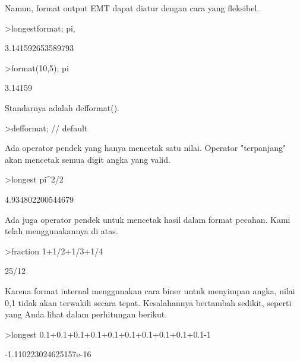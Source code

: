 \documentclass[a4paper,10pt]{article}
\begin{document}
\begin{eulernotebook}
\begin{eulercomment}
\begin{eulercomment}
\begin{eulercomment}
Namun, format output EMT dapat diatur dengan cara yang fleksibel.
\end{eulercomment}
\begin{eulerprompt}
>longestformat; pi,
\end{eulerprompt}
\begin{euleroutput}
  3.141592653589793
\end{euleroutput}
\begin{eulerprompt}
>format(10,5); pi
\end{eulerprompt}
\begin{euleroutput}
    3.14159 
\end{euleroutput}
\begin{eulercomment}
Standarnya adalah defformat().
\end{eulercomment}
\begin{eulerprompt}
>defformat; // default
\end{eulerprompt}
\begin{eulercomment}
Ada operator pendek yang hanya mencetak satu nilai. Operator
"terpanjang" akan mencetak semua digit angka yang valid.
\end{eulercomment}
\begin{eulerprompt}
>longest pi^2/2
\end{eulerprompt}
\begin{euleroutput}
        4.934802200544679 
\end{euleroutput}
\begin{eulercomment}
Ada juga operator pendek untuk mencetak hasil dalam format pecahan.
Kami telah menggunakannya di atas.
\end{eulercomment}
\begin{eulerprompt}
>fraction 1+1/2+1/3+1/4
\end{eulerprompt}
\begin{euleroutput}
  25/12
\end{euleroutput}
\begin{eulercomment}
Karena format internal menggunakan cara biner untuk menyimpan angka,
nilai 0,1 tidak akan terwakili secara tepat. Kesalahannya bertambah
sedikit, seperti yang Anda lihat dalam perhitungan berikut.
\end{eulercomment}
\begin{eulerprompt}
>longest 0.1+0.1+0.1+0.1+0.1+0.1+0.1+0.1+0.1+0.1-1
\end{eulerprompt}
\begin{euleroutput}
   -1.110223024625157e-16 
\end{euleroutput}
\begin{eulercomment}

\end{eulercomment}
\end{eulercomment}
\end{eulercomment}
\end{eulernotebook}
\end{document}

